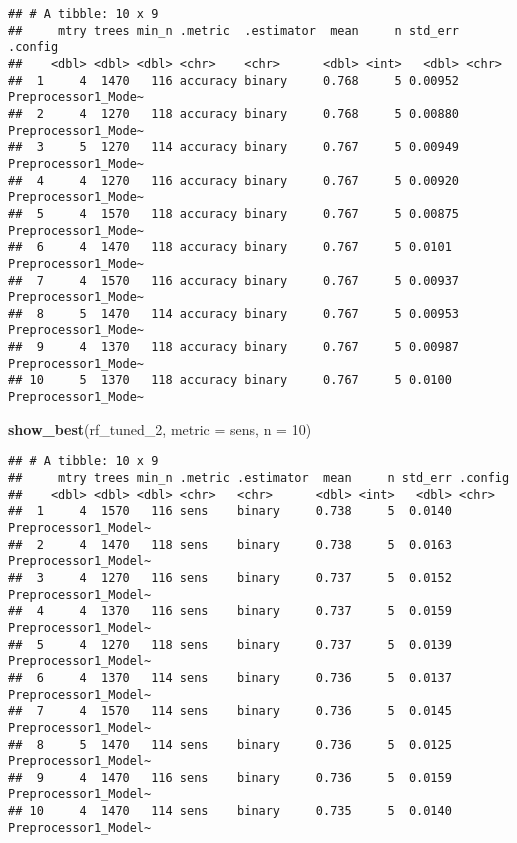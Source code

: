 \documentclass[
]{article}
\newenvironment{Shaded}{\begin{snugshade}}{\end{snugshade}}
\newcommand{\AttributeTok}[1]{\textcolor[rgb]{0.13,0.29,0.53}{#1}}
\newcommand{\DecValTok}[1]{\textcolor[rgb]{0.00,0.00,0.81}{#1}}
\newcommand{\FunctionTok}[1]{\textcolor[rgb]{0.13,0.29,0.53}{\textbf{#1}}}
\newcommand{\NormalTok}[1]{#1}
\newcommand{\StringTok}[1]{\textcolor[rgb]{0.31,0.60,0.02}{#1}}
\begin{document}
\begin{verbatim}
## # A tibble: 10 x 9
##     mtry trees min_n .metric  .estimator  mean     n std_err .config            
##    <dbl> <dbl> <dbl> <chr>    <chr>      <dbl> <int>   <dbl> <chr>              
##  1     4  1470   116 accuracy binary     0.768     5 0.00952 Preprocessor1_Mode~
##  2     4  1270   118 accuracy binary     0.768     5 0.00880 Preprocessor1_Mode~
##  3     5  1270   114 accuracy binary     0.767     5 0.00949 Preprocessor1_Mode~
##  4     4  1270   116 accuracy binary     0.767     5 0.00920 Preprocessor1_Mode~
##  5     4  1570   118 accuracy binary     0.767     5 0.00875 Preprocessor1_Mode~
##  6     4  1470   118 accuracy binary     0.767     5 0.0101  Preprocessor1_Mode~
##  7     4  1570   116 accuracy binary     0.767     5 0.00937 Preprocessor1_Mode~
##  8     5  1470   114 accuracy binary     0.767     5 0.00953 Preprocessor1_Mode~
##  9     4  1370   118 accuracy binary     0.767     5 0.00987 Preprocessor1_Mode~
## 10     5  1370   118 accuracy binary     0.767     5 0.0100  Preprocessor1_Mode~
\end{verbatim}

\begin{Shaded}
\begin{Highlighting}[]
\FunctionTok{show\_best}\NormalTok{(rf\_tuned\_2, }\AttributeTok{metric =} \StringTok{\textquotesingle{}sens\textquotesingle{}}\NormalTok{, }\AttributeTok{n =} \DecValTok{10}\NormalTok{)}
\end{Highlighting}
\end{Shaded}

\begin{verbatim}
## # A tibble: 10 x 9
##     mtry trees min_n .metric .estimator  mean     n std_err .config             
##    <dbl> <dbl> <dbl> <chr>   <chr>      <dbl> <int>   <dbl> <chr>               
##  1     4  1570   116 sens    binary     0.738     5  0.0140 Preprocessor1_Model~
##  2     4  1470   118 sens    binary     0.738     5  0.0163 Preprocessor1_Model~
##  3     4  1270   116 sens    binary     0.737     5  0.0152 Preprocessor1_Model~
##  4     4  1370   116 sens    binary     0.737     5  0.0159 Preprocessor1_Model~
##  5     4  1270   118 sens    binary     0.737     5  0.0139 Preprocessor1_Model~
##  6     4  1370   114 sens    binary     0.736     5  0.0137 Preprocessor1_Model~
##  7     4  1570   114 sens    binary     0.736     5  0.0145 Preprocessor1_Model~
##  8     5  1470   114 sens    binary     0.736     5  0.0125 Preprocessor1_Model~
##  9     4  1470   116 sens    binary     0.736     5  0.0159 Preprocessor1_Model~
## 10     4  1470   114 sens    binary     0.735     5  0.0140 Preprocessor1_Model~
\end{verbatim}
\end{document}
